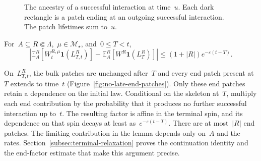 \documentclass[EJP,preprint,NODS,nobera]{ejpecp}
\newcommand{\E}{\mathbb{E}}
\newcommand{\bb}[1]{\left(#1\right)}
\newcommand{\Cb}[1]{\left[#1\right]}
\newcommand{\abs}[1]{\left|#1\right|}
\newcommand{\ind}{\mathbf{1}}
\begin{document}
\begin{figure}[htbp]
\endgroup
\caption{The ancestry of a successful interaction at time~$u$. Each dark
rectangle is a patch ending at an outgoing successful interaction. The patch
lifetimes sum to~$u$.}
\label{fig:backward-outgoing-chain}
\end{figure}
\FloatBarrier

{\color{red}
\begin{lemma}
\label{lem:no-late-relaxation}
For~$A\subseteq R\Subset\Lambda$,~$\mu\in\mathcal M_\star$, and~$0\leq T<t$,
\begin{equation}
\abs{
\E_A^R\Cb{W_t^{R,\mu}\ind\bb{L_{T,t}^R}}
-\E_A^R\Cb{W^R\ind\bb{L_T^R}}
}
\leq(1+\abs R)e^{-\varepsilon(t-T)}.
\label{eq:no-late-relaxation-bound}
\end{equation}
\end{lemma}
}

{\color{red}
On~$L_{T,t}^R$, the bulk patches are unchanged after~$T$ and every end patch
present at~$T$ extends to time~$t$ (Figure~\ref{fig:no-late-end-patches}). Only these end patches retain a dependence
on the initial law. Conditional on the skeleton at~$T$, multiply each end
contribution by the probability that it produces no further successful
interaction up to~$t$. The resulting factor is affine in the terminal spin,
and its dependence on that spin decays at least as~$e^{-\varepsilon(t-T)}$.
There are at most~$\abs R$ end patches.
The limiting contribution in the lemma depends only on~$A$ and the rates.
Section~\ref{subsec:terminal-relaxation} proves the continuation identity and
the end-factor estimate that make this argument precise.
}
\end{document}
